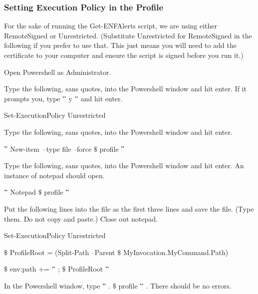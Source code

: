 \documentclass[a4paper,12pt]{report}
\begin{document}
\subsubsection*{Setting Execution Policy in the Profile}
 \par
For the sake of running the Get-ENFAlerts script, we are using either RemoteSigned or Unrestricted. (Substitute Unrestricted for RemoteSigned in the following if you prefer to use that. This just means you will need to add the certificate to your computer and ensure the script is signed before you run it.) \par
\begin{myEnumerate}
\item Open Powershell as Administrator. \par
\item Type the following, sans quotes, into the Powershell window and hit enter. If it prompts you, type  $ " $ y $ " $  and hit enter. \par
{\fontsize{9pt}{9pt}\selectfont Set-ExecutionPolicy Unrestricted} \par
\item Type the following, sans quotes, into the Powershell window and hit enter. \par
\begin{myEnumerate}
\item  $ " $ New-item~–type file –force   $  \$  $ profile $ " $  \par
\end{myEnumerate}
\item Type the following, sans quotes, into the Powershell window and hit enter. An instance of notepad should open. \par
\begin{myEnumerate}
\item  $ " $ Notepad  $  \$  $ profile $ " $  \par
\end{myEnumerate}
\item Put the following lines into the file as the first three lines and save the file. (Type them. Do not copy and paste.) Close out notepad. \par
{\fontsize{9pt}{9pt}\selectfont Set-ExecutionPolicy Unrestricted} \par
{\fontsize{9pt}{9pt}\selectfont  $  \$  $ ProfileRoot = (Split-Path –Parent  $  \$  $ MyInvocation.MyCommand.Path)} \par
{\fontsize{9pt}{9pt}\selectfont  $  \$  $ env:path +=  $ " $ ; $  \$  $ ProfileRoot $ " $ } \par
\item In the Powershell window, type  $ " $ .  $  \$  $ profile $ " $ . There should be no errors. \par
\end{myEnumerate}
\end{document}
